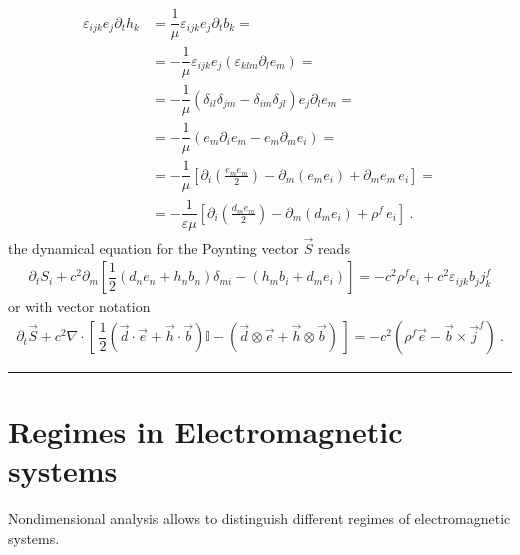 \documentclass[letterpaper,10pt,english]{jupyterBook}
\begin{document}
\begin{equation*}
\begin{split}\begin{aligned}
  \varepsilon_{ijk} e_j \partial_t h_k
  & =   \dfrac{1}{\mu} \varepsilon_{ijk} e_j \partial_t b_k = \\
  & = - \dfrac{1}{\mu} \varepsilon_{ijk} e_j \left( \varepsilon_{klm} \partial_l e_m \right) = \\
  & = - \dfrac{1}{\mu} \left( \delta_{il} \delta_{jm} - \delta_{im} \delta_{jl} \right) e_j \partial_l e_m =  \\
  & = - \dfrac{1}{\mu} \left( e_m \partial_i e_m - e_m \partial_m e_i \right) =  \\
  & = - \dfrac{1}{\mu} \left[ \partial_i \left(\frac{e_m e_m}{2}\right) -  \partial_m \left( e_m e_i \right) + \partial_m e_m \, e_i \right] = \\
  & = - \dfrac{1}{\varepsilon \mu} \left[ \partial_i \left(\frac{d_m e_m}{2}\right) - \partial_m \left( d_m e_i \right) + \rho^f \, e_i \right] \ .
\end{aligned}\end{split}
\end{equation*}
\sphinxAtStartPar
the dynamical equation for the Poynting vector \(\vec{S}\) reads
\begin{equation*}
\begin{split}\partial_t S_i + c^2 \partial_m \left[ \dfrac{1}{2}\left( d_n e_n + h_n b_n \right) \delta_{mi} - \left( h_m b_i + d_m e_i \right) \right] = - c^2 \rho^f e_i + c^2 \varepsilon_{ijk} b_j j_k^f \end{split}
\end{equation*}
\sphinxAtStartPar
or with vector notation
\begin{equation*}
\begin{split}\partial_t \vec{S} + c^2 \nabla \cdot \left[ \, \dfrac{1}{2} \left( \vec{d} \cdot \vec{e} + \vec{h} \cdot \vec{b} \right) \mathbb{I} - \left( \vec{d} \otimes \vec{e} + \vec{h} \otimes \vec{b} \right) \, \right] = - c^2 \left( \rho^f \vec{e} - \vec{b} \times \vec{j}^f \right) \ .\end{split}
\end{equation*}

\bigskip\hrule\bigskip


\sphinxstepscope


\chapter{Regimes in Electromagnetic systems}
\label{\detokenize{ch/regimes:regimes-in-electromagnetic-systems}}\label{\detokenize{ch/regimes:classical-electromagnetism-regimes}}\label{\detokenize{ch/regimes::doc}}
\sphinxAtStartPar
Non\sphinxhyphen{}dimensional analysis allows to distinguish different regimes of electromagnetic systems.
\end{document}
